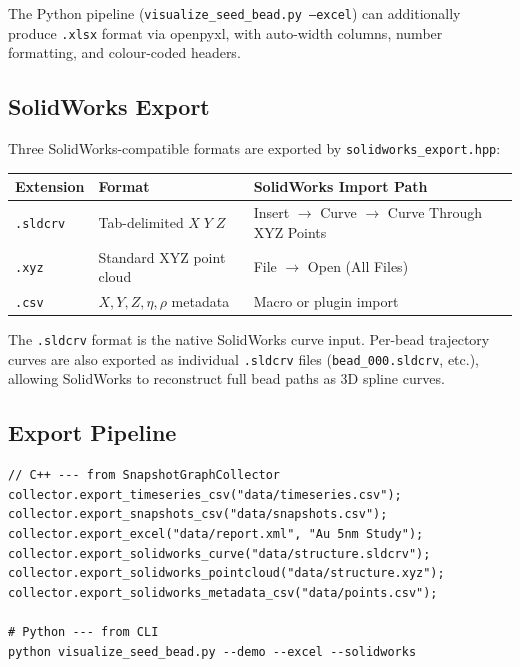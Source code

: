 \documentclass[11pt, a4paper, oneside]{article}
\newcommand{\file}[1]{\texttt{#1}}
\newcommand{\type}[1]{\texttt{#1}}
\begin{document}
\noindent The Python pipeline (\file{visualize\_seed\_bead.py --excel})
can additionally produce \texttt{.xlsx} format via openpyxl, with
auto-width columns, number formatting, and colour-coded headers.

\subsection{SolidWorks Export}
\label{sec:solidworks-export}

Three SolidWorks-compatible formats are exported by
\type{solidworks\_export.hpp}:

\begin{center}
\begin{tabular}{lll}
  \toprule
  \textbf{Extension} & \textbf{Format} & \textbf{SolidWorks Import Path} \\
  \midrule
  \texttt{.sldcrv} & Tab-delimited $X\;Y\;Z$
    & Insert $\to$ Curve $\to$ Curve Through XYZ Points \\
  \texttt{.xyz} & Standard XYZ point cloud
    & File $\to$ Open (All Files) \\
  \texttt{.csv} & $X,Y,Z,\eta,\rho$ metadata
    & Macro or plugin import \\
  \bottomrule
\end{tabular}
\end{center}

\noindent The \texttt{.sldcrv} format is the native SolidWorks curve
input.  Per-bead trajectory curves are also exported as individual
\texttt{.sldcrv} files (\texttt{bead\_000.sldcrv}, etc.), allowing
SolidWorks to reconstruct full bead paths as 3D spline curves.

\subsection{Export Pipeline}
\label{sec:export-pipeline}

\begin{lstlisting}
// C++ --- from SnapshotGraphCollector
collector.export_timeseries_csv("data/timeseries.csv");
collector.export_snapshots_csv("data/snapshots.csv");
collector.export_excel("data/report.xml", "Au 5nm Study");
collector.export_solidworks_curve("data/structure.sldcrv");
collector.export_solidworks_pointcloud("data/structure.xyz");
collector.export_solidworks_metadata_csv("data/points.csv");

# Python --- from CLI
python visualize_seed_bead.py --demo --excel --solidworks
\end{lstlisting}
\end{document}
